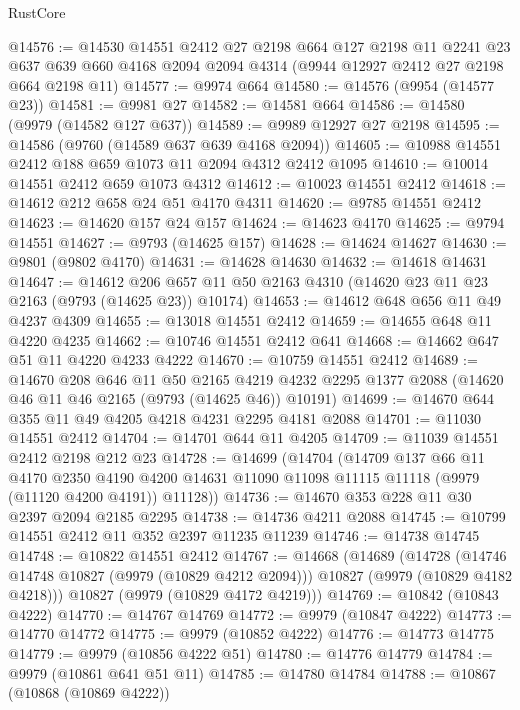 \begin{lexlean}{RustCore}
\begin{coremodule}
@14576 := @14530
    @14551
    @2412
    @27
    @2198
    @664
    @127
    @2198
    @11
    @2241
    @23
    @637
    @639
    @660
    @4168
    @2094
    @2094
    @4314
    (@9944 @12927 @2412 @27 @2198 @664 @2198 @11)
@14577 := @9974 @664
@14580 := @14576 (@9954 (@14577 @23))
@14581 := @9981 @27
@14582 := @14581 @664
@14586 := @14580 (@9979 (@14582 @127 @637))
@14589 := @9989 @12927 @27 @2198
@14595 := @14586 (@9760 (@14589 @637 @639 @4168 @2094))
@14605 := @10988 @14551 @2412 @188 @659 @1073 @11 @2094 @4312 @2412 @1095
@14610 := @10014 @14551 @2412 @659 @1073 @4312
@14612 := @10023 @14551 @2412
@14618 := @14612 @212 @658 @24 @51 @4170 @4311
@14620 := @9785 @14551 @2412
@14623 := @14620 @157 @24 @157
@14624 := @14623 @4170
@14625 := @9794 @14551
@14627 := @9793 (@14625 @157)
@14628 := @14624 @14627
@14630 := @9801 (@9802 @4170)
@14631 := @14628 @14630
@14632 := @14618 @14631
@14647 := @14612
    @206
    @657
    @11
    @50
    @2163
    @4310
    (@14620 @23 @11 @23 @2163 (@9793 (@14625 @23)) @10174)
@14653 := @14612 @648 @656 @11 @49 @4237 @4309
@14655 := @13018 @14551 @2412
@14659 := @14655 @648 @11 @4220 @4235
@14662 := @10746 @14551 @2412 @641
@14668 := @14662 @647 @51 @11 @4220 @4233 @4222
@14670 := @10759 @14551 @2412
@14689 := @14670
    @208
    @646
    @11
    @50
    @2165
    @4219
    @4232
    @2295
    @1377
    @2088
    (@14620 @46 @11 @46 @2165 (@9793 (@14625 @46)) @10191)
@14699 := @14670 @644 @355 @11 @49 @4205 @4218 @4231 @2295 @4181 @2088
@14701 := @11030 @14551 @2412
@14704 := @14701 @644 @11 @4205
@14709 := @11039 @14551 @2412 @2198 @212 @23
@14728 := @14699
    (@14704
      (@14709
        @137
        @66
        @11
        @4170
        @2350
        @4190
        @4200
        @14631
        @11090
        @11098
        @11115
        @11118
        (@9979 (@11120 @4200 @4191))
        @11128))
@14736 := @14670 @353 @228 @11 @30 @2397 @2094 @2185 @2295
@14738 := @14736 @4211 @2088
@14745 := @10799 @14551 @2412 @11 @352 @2397 @11235 @11239
@14746 := @14738 @14745
@14748 := @10822 @14551 @2412
@14767 := @14668
    (@14689
      (@14728
        (@14746 @14748 @10827 (@9979 (@10829 @4212 @2094)))
        @10827
        (@9979 (@10829 @4182 @4218)))
      @10827
      (@9979 (@10829 @4172 @4219)))
@14769 := @10842 (@10843 @4222)
@14770 := @14767 @14769
@14772 := @9979 (@10847 @4222)
@14773 := @14770 @14772
@14775 := @9979 (@10852 @4222)
@14776 := @14773 @14775
@14779 := @9979 (@10856 @4222 @51)
@14780 := @14776 @14779
@14784 := @9979 (@10861 @641 @51 @11)
@14785 := @14780 @14784
@14788 := @10867 (@10868 (@10869 @4222))

\end{coremodule}
\end{lexlean}
